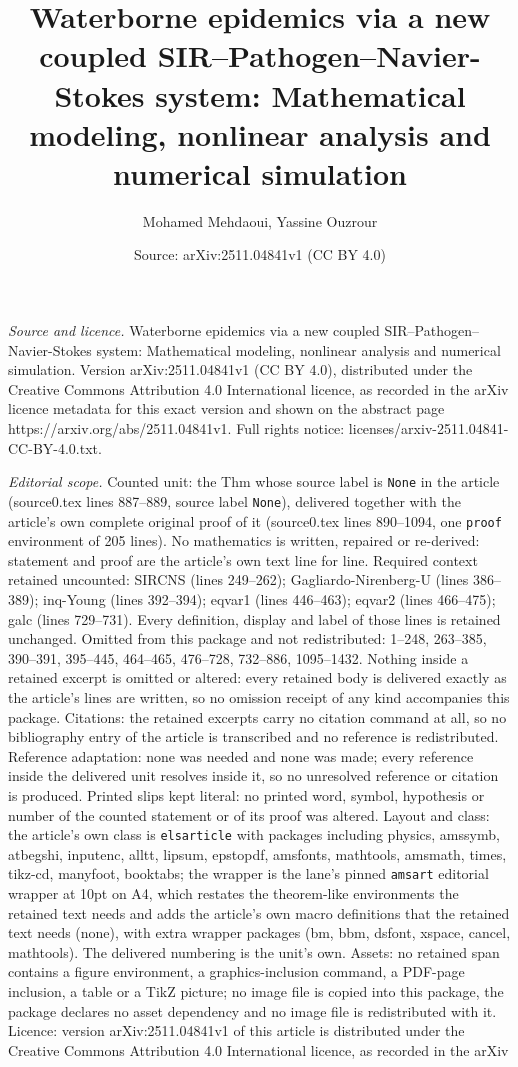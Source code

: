 \documentclass[10pt,a4paper]{amsart}
\title[Waterborne epidemics via a new coupled SIR--Pathogen--Navier]{Waterborne epidemics via a new coupled SIR--Pathogen--Navier-Stokes system: Mathematical modeling, nonlinear analysis and numerical simulation}
\author{Mohamed Mehdaoui, Yassine Ouzrour}
\date{Source: arXiv:2511.04841v1 (CC BY 4.0)}
\begin{document}
\maketitle

\noindent\emph{Source and licence.} Waterborne epidemics via a new coupled SIR--Pathogen--Navier-Stokes system: Mathematical modeling, nonlinear analysis and numerical simulation. Version arXiv:2511.04841v1 (CC BY 4.0), distributed under the Creative Commons Attribution 4.0 International licence, as recorded in the arXiv licence metadata for this exact version and shown on the abstract page https://arxiv.org/abs/2511.04841v1. Full rights notice: licenses/arxiv-2511.04841-CC-BY-4.0.txt.\par\smallskip

\noindent\textit{Editorial scope.} Counted unit: the Thm whose source label is \texttt{None} in the article (source0.tex lines 887--889, source label \texttt{None}), delivered together with the article's own complete original proof of it (source0.tex lines 890--1094, one \texttt{proof} environment of 205 lines). No mathematics is written, repaired or re-derived: statement and proof are the article's own text line for line. Required context retained uncounted: SIRCNS (lines 249--262); Gagliardo-Nirenberg-U (lines 386--389); inq-Young (lines 392--394); eqvar1 (lines 446--463); eqvar2 (lines 466--475); galc (lines 729--731). Every definition, display and label of those lines is retained unchanged. Omitted from this package and not redistributed: 1--248, 263--385, 390--391, 395--445, 464--465, 476--728, 732--886, 1095--1432. Nothing inside a retained excerpt is omitted or altered: every retained body is delivered exactly as the article's lines are written, so no omission receipt of any kind accompanies this package. Citations: the retained excerpts carry no citation command at all, so no bibliography entry of the article is transcribed and no reference is redistributed. Reference adaptation: none was needed and none was made; every reference inside the delivered unit resolves inside it, so no unresolved reference or citation is produced. Printed slips kept literal: no printed word, symbol, hypothesis or number of the counted statement or of its proof was altered. Layout and class: the article's own class is \texttt{elsarticle} with packages including physics, amssymb, atbegshi, inputenc, alltt, lipsum, epstopdf, amsfonts, mathtools, amsmath, times, tikz-cd, manyfoot, booktabs; the wrapper is the lane's pinned \texttt{amsart} editorial wrapper at 10pt on A4, which restates the theorem-like environments the retained text needs and adds the article's own macro definitions that the retained text needs (none), with extra wrapper packages (bm, bbm, dsfont, xspace, cancel, mathtools). The delivered numbering is the unit's own. Assets: no retained span contains a figure environment, a graphics-inclusion command, a PDF-page inclusion, a table or a TikZ picture; no image file is copied into this package, the package declares no asset dependency and no image file is redistributed with it. Licence: version arXiv:2511.04841v1 of this article is distributed under the Creative Commons Attribution 4.0 International licence, as recorded in the arXiv 
\end{document}
